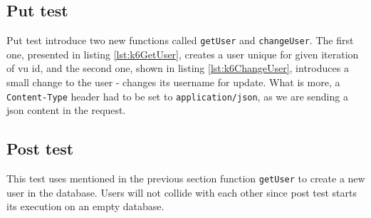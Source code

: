 \subsection{Put test}
Put test introduce two new functions called \lstinline{getUser} and \lstinline{changeUser}. The first one, presented in listing \ref{lst:k6GetUser}, creates a user unique for given iteration of \acrshort{vu} id, and the second one, shown in listing \ref{lst:k6ChangeUser}, introduces a small change to the user - changes its username for update. What is more, a \lstinline{Content-Type} header had to be set to \lstinline{application/json}, as we are sending a \acrshort{json} content in the request.




\subsection{Post test}
This test uses mentioned in the previous section function \lstinline{getUser} to create a new user in the database. Users will not collide with each other since post test starts its execution on an empty database.

